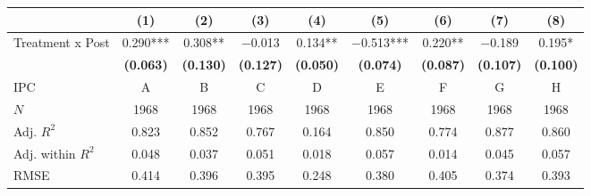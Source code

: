 
\begin{tabular}[t]{lcccccccc}
\toprule
  & (1) & (2) & (3) & (4) & (5) & (6) & (7) & (8)\\
\midrule
Treatment x Post & \num{0.290}*** & \num{0.308}** & \num{-0.013} & \num{0.134}** & \num{-0.513}*** & \num{0.220}** & \num{-0.189} & \num{0.195}*\\
\textbf{} & \textbf{(\num{0.063})} & \textbf{(\num{0.130})} & \textbf{(\num{0.127})} & \textbf{(\num{0.050})} & \textbf{(\num{0.074})} & \textbf{(\num{0.087})} & \textbf{(\num{0.107})} & \textbf{(\num{0.100})}\\
\midrule
IPC & A & B & C & D & E & F & G & H\\
$N$ & \num{1968} & \num{1968} & \num{1968} & \num{1968} & \num{1968} & \num{1968} & \num{1968} & \num{1968}\\
Adj. $R^2$ & \num{0.823} & \num{0.852} & \num{0.767} & \num{0.164} & \num{0.850} & \num{0.774} & \num{0.877} & \num{0.860}\\
Adj. within $R^2$ & \num{0.048} & \num{0.037} & \num{0.051} & \num{0.018} & \num{0.057} & \num{0.014} & \num{0.045} & \num{0.057}\\
RMSE & \num{0.414} & \num{0.396} & \num{0.395} & \num{0.248} & \num{0.380} & \num{0.405} & \num{0.374} & \num{0.393}\\
\bottomrule
\end{tabular}
